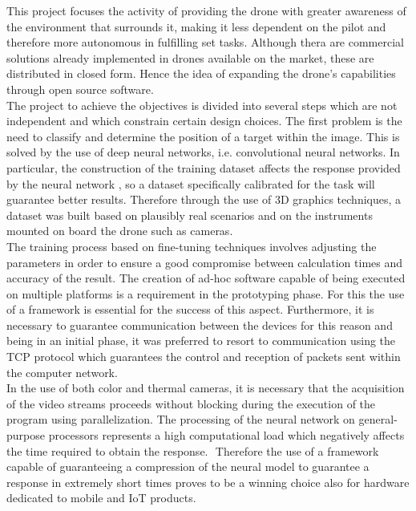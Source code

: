 \noindent This project focuses the activity of providing the drone with greater 
awareness of the environment that surrounds it, making it less dependent on the 
pilot and therefore more autonomous in fulfilling set tasks.
Although thera are commercial solutions already implemented in drones available on the 
market, these are distributed in closed form.
Hence the idea of expanding the drone's capabilities through open source 
software.\\
The project to achieve the objectives is divided into several steps which are
not independent and which constrain certain design choices. The first problem is
the need to classify and determine the position of a target within the image. 
This is solved by the use of deep neural networks, i.e. convolutional neural
networks. 
In particular, the construction of the training dataset affects the response
provided by the neural network , so a dataset specifically calibrated for the
task will guarantee better results. Therefore through the use of 3D graphics
techniques, a dataset was built based on plausibly real scenarios and on the
instruments mounted on board the drone such as cameras. \\
The training process based on fine-tuning techniques involves adjusting the
parameters in order to ensure a good compromise between calculation times and
accuracy of the result. The creation of ad-hoc software capable of being
executed on multiple platforms is a requirement in the prototyping phase. For
this the use of a framework is essential for the success of this aspect. 
Furthermore, it is necessary to guarantee communication between the devices for
this reason and being in an initial phase, it was preferred to resort to
communication using the TCP protocol which guarantees the control and reception
of packets sent within the computer network. \\ 
In the use of both color and thermal cameras, it is necessary that the
acquisition of the video streams proceeds without blocking during the execution
of the program using parallelization. 
The processing of the neural network on general-purpose processors represents a
high computational load which negatively affects the time required to obtain the
response.  Therefore the use of a framework capable of guaranteeing a
compression of the neural model to guarantee a response in extremely short times
proves to be a winning choice also for hardware dedicated to mobile and IoT
products.\\

